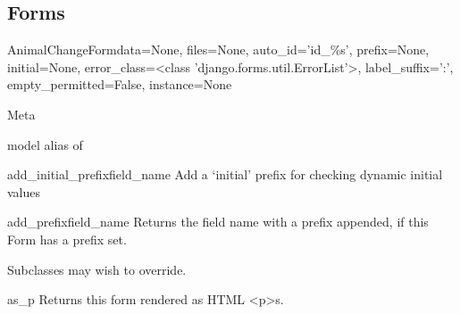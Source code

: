 \documentclass[letterpaper,10pt,english]{sphinxmanual}
\begin{document}
\subsection{Forms}
\hypertarget{module-animal.forms}{}
\modulesynopsis{}

\hypertarget{animal.forms.AnimalChangeForm}{}\begin{classdesc}{AnimalChangeForm}{data=None, files=None, auto\_id='id\_\%s', prefix=None, initial=None, error\_class=\textless{}class 'django.forms.util.ErrorList'\textgreater{}, label\_suffix=':', empty\_permitted=False, instance=None}~

\hypertarget{animal.forms.AnimalChangeForm.Meta}{}\begin{classdesc}{Meta}{}~

\hypertarget{animal.forms.AnimalChangeForm.Meta.model}{}\begin{memberdesc}{model}
alias of 
\end{memberdesc}
\end{classdesc}

\hypertarget{animal.forms.AnimalChangeForm.add_initial_prefix}{}\begin{methoddesc}[AnimalChangeForm]{add\_initial\_prefix}{field\_name}
Add a `initial' prefix for checking dynamic initial values
\end{methoddesc}

\hypertarget{animal.forms.AnimalChangeForm.add_prefix}{}\begin{methoddesc}[AnimalChangeForm]{add\_prefix}{field\_name}
Returns the field name with a prefix appended, if this Form has a
prefix set.

Subclasses may wish to override.
\end{methoddesc}

\hypertarget{animal.forms.AnimalChangeForm.as_p}{}\begin{methoddesc}[AnimalChangeForm]{as\_p}{}
Returns this form rendered as HTML \textless{}p\textgreater{}s.
\end{methoddesc}


\end{classdesc}
\end{document}
